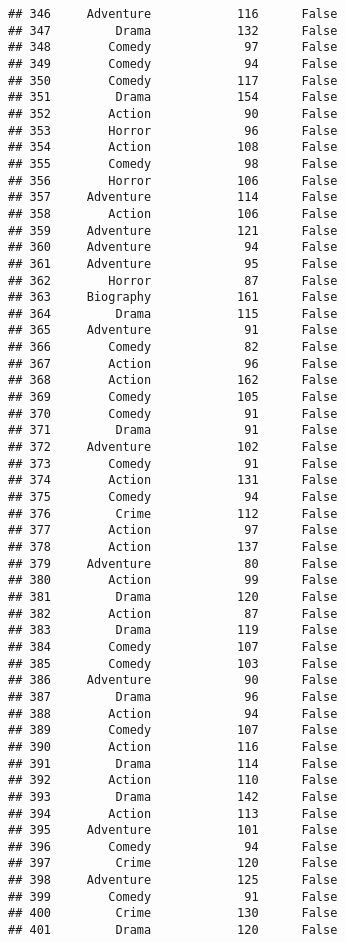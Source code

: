 \documentclass[
]{article}
\begin{document}
\begin{verbatim}
## 346     Adventure            116      False
## 347         Drama            132      False
## 348        Comedy             97      False
## 349        Comedy             94      False
## 350        Comedy            117      False
## 351         Drama            154      False
## 352        Action             90      False
## 353        Horror             96      False
## 354        Action            108      False
## 355        Comedy             98      False
## 356        Horror            106      False
## 357     Adventure            114      False
## 358        Action            106      False
## 359     Adventure            121      False
## 360     Adventure             94      False
## 361     Adventure             95      False
## 362        Horror             87      False
## 363     Biography            161      False
## 364         Drama            115      False
## 365     Adventure             91      False
## 366        Comedy             82      False
## 367        Action             96      False
## 368        Action            162      False
## 369        Comedy            105      False
## 370        Comedy             91      False
## 371         Drama             91      False
## 372     Adventure            102      False
## 373        Comedy             91      False
## 374        Action            131      False
## 375        Comedy             94      False
## 376         Crime            112      False
## 377        Action             97      False
## 378        Action            137      False
## 379     Adventure             80      False
## 380        Action             99      False
## 381         Drama            120      False
## 382        Action             87      False
## 383         Drama            119      False
## 384        Comedy            107      False
## 385        Comedy            103      False
## 386     Adventure             90      False
## 387         Drama             96      False
## 388        Action             94      False
## 389        Comedy            107      False
## 390        Action            116      False
## 391         Drama            114      False
## 392        Action            110      False
## 393         Drama            142      False
## 394        Action            113      False
## 395     Adventure            101      False
## 396        Comedy             94      False
## 397         Crime            120      False
## 398     Adventure            125      False
## 399        Comedy             91      False
## 400         Crime            130      False
## 401         Drama            120      False

\end{verbatim}
\end{document}
